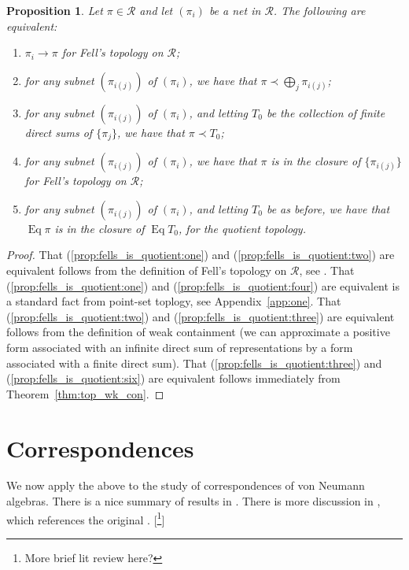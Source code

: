 \documentclass[a4paper,11pt]{article}
\newcommand{\mc}[1]{{\mathcal{#1}}}
\newcommand{\Eq}{\operatorname{Eq}}
\newtheorem{proposition}[lemma]{Proposition}
\begin{document}
\begin{proposition}\label{prop:fells_is_quotient}
Let $\pi\in\mc R$ and let $(\pi_i)$ be a net in $\mc R$.
The following are equivalent:
\begin{enumerate}
\item\label{prop:fells_is_quotient:one}
$\pi_i \rightarrow \pi$ for Fell's topology on $\mc R$;
\item\label{prop:fells_is_quotient:two}
for any subnet $(\pi_{i(j)})$ of $(\pi_i)$, we have that
$\pi\prec \bigoplus_j \pi_{i(j)}$;
\item\label{prop:fells_is_quotient:three}
for any subnet $(\pi_{i(j)})$ of $(\pi_i)$, and letting $T_0$ be the collection
of finite direct sums of $\{\pi_j\}$, we have that $\pi\prec T_0$;
\item\label{prop:fells_is_quotient:four}
for any subnet $(\pi_{i(j)})$ of $(\pi_i)$, we have that
$\pi$ is in the closure of $\{\pi_{i(j)}\}$ for Fell's topology on $\mc R$;
\item\label{prop:fells_is_quotient:six}
for any subnet $(\pi_{i(j)})$ of $(\pi_i)$, and letting $T_0$ be as before,
we have that $\Eq\pi$ is in the closure of $\Eq T_0$, for the quotient topology.
\end{enumerate}
\end{proposition}
\begin{proof}
That (\ref{prop:fells_is_quotient:one}) and (\ref{prop:fells_is_quotient:two})
are equivalent follows from the definition of Fell's topology on $\mc R$,
see \cite[Proposition~F.2.2]{bhv}.  That (\ref{prop:fells_is_quotient:one})
and (\ref{prop:fells_is_quotient:four}) are equivalent is a standard fact from
point-set toplogy, see Appendix~\ref{app:one}.
That (\ref{prop:fells_is_quotient:two}) and (\ref{prop:fells_is_quotient:three})
are equivalent follows from the definition of weak containment (we can
approximate a positive form associated with an infinite direct sum of
representations by a form associated with a finite direct sum).
That (\ref{prop:fells_is_quotient:three}) and (\ref{prop:fells_is_quotient:six})
are equivalent follows immediately from Theorem~\ref{thm:top_wk_con}.
\end{proof}




\section{Correspondences}

We now apply the above to the study of correspondences of von Neumann algebras.
There is a nice summary of results in \cite[page~316]{ad1}.  There is more
discussion in \cite[Section~1.12]{ad2}, which references the original \cite{cj}.
[\footnote{More brief lit review here?}]
\end{document}
